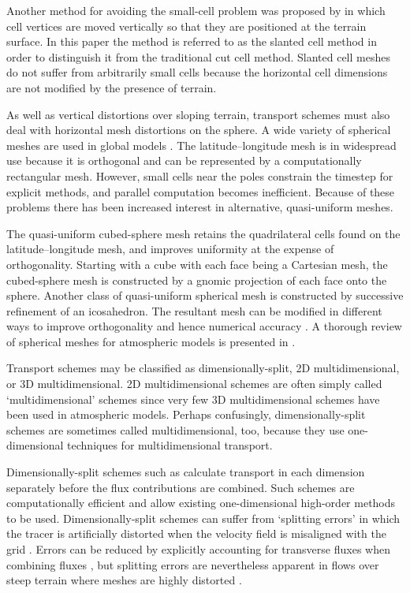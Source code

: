 Another method for avoiding the small-cell problem was proposed by \citep{shaw-weller2016} in which cell vertices are moved vertically so that they are positioned at the terrain surface.  In this paper the method is referred to as the slanted cell method in order to distinguish it from the traditional cut cell method.  Slanted cell meshes do not suffer from arbitrarily small cells because the horizontal cell dimensions are not modified by the presence of terrain.

As well as vertical distortions over sloping terrain, transport schemes must also deal with horizontal mesh distortions on the sphere.  A wide variety of spherical meshes are used in global models \citep{staniforth-thuburn2012}.  The latitude--longitude mesh is in widespread use because it is orthogonal and can be represented by a computationally rectangular mesh.  However, small cells near the poles constrain the timestep for explicit methods, and parallel computation becomes inefficient.  Because of these problems there has been increased interest in alternative, quasi-uniform meshes.

The quasi-uniform cubed-sphere mesh retains the quadrilateral cells found on the latitude--longitude mesh, and improves uniformity at the expense of orthogonality.  Starting with a cube with each face being a Cartesian mesh, the cubed-sphere mesh is constructed by a gnomic projection of each face onto the sphere.
Another class of quasi-uniform spherical mesh is constructed by successive refinement of an icosahedron.  The resultant mesh can be modified in different ways to improve orthogonality and hence numerical accuracy \citep{heikes-randall1995b,tomita2002}.  A thorough review of spherical meshes for atmospheric models is presented in \citep{staniforth-thuburn2012}.

Transport schemes may be classified as dimensionally-split, 2D multidimensional, or 3D multidimensional.  2D multidimensional schemes are often simply called `multidimensional' schemes since very few 3D multidimensional schemes have been used in atmospheric models.
Perhaps confusingly, dimensionally-split schemes are sometimes called multidimensional, too, because they use one-dimensional techniques for multidimensional transport.

Dimensionally-split schemes such as \citep{lin-rood1996,putman-lin2007,katta2015} calculate transport in each dimension separately before the flux contributions are combined.  Such schemes are computationally efficient and allow existing one-dimensional high-order methods to be used.
  Dimensionally-split schemes can suffer from `splitting errors' in which the tracer is artificially distorted when the velocity field is misaligned with the grid \citep{leonard1993}.  Errors can be reduced by explicitly accounting for transverse fluxes when combining fluxes \citep{leonard1996}, but splitting errors are nevertheless apparent in flows over steep terrain where meshes are highly distorted \citep{weller2017}.

